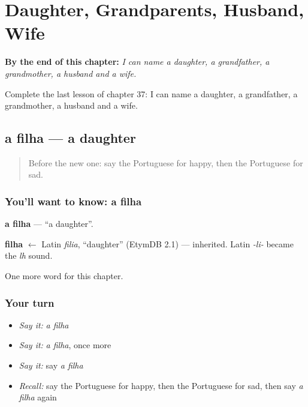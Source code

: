 
\chapter{Daughter, Grandparents, Husband, Wife}
\label{ch:pt-daughter-grandparents-husband-wife}

\begin{chapteropening}
\textbf{By the end of this chapter:} \emph{I can name a daughter, a grandfather, a grandmother, a husband and a wife.}

Complete the last lesson of chapter 37: I can name a daughter, a grandfather, a grandmother, a husband and a wife.
\end{chapteropening}

\section[a filha]{a filha — a daughter}

\label{lesson:PT-C37-filha}



\begin{quote}
Before the new one: say the Portuguese for happy, then the Portuguese for sad.
\end{quote}

\subsection*{You'll want to know: a filha}
\textbf{a filha} — \textquotedblleft{}a daughter\textquotedblright{}.

\begin{cousinweb}
\textbf{filha} $\leftarrow$ Latin \emph{filia}, \textquotedblleft{}daughter\textquotedblright{} (EtymDB 2.1) — inherited. Latin \emph{-li-} became the \emph{lh} sound.
\end{cousinweb}

\begin{grammarlens}[title={What you've built}]
One more word for this chapter.
\end{grammarlens}

\subsection*{Your turn}
\begin{itemize}
\raggedright
  \item \emph{Say it:} \emph{a filha}
  \item \emph{Say it:} \emph{a filha}, once more
  \item \emph{Say it:} say \emph{a filha}
  \item \emph{Recall:} say the Portuguese for happy, then the Portuguese for sad, then say \emph{a filha} again
\end{itemize}

